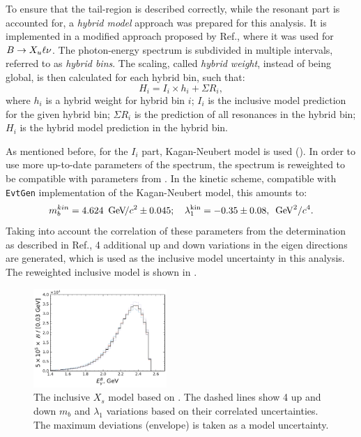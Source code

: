 To ensure that the tail-region is described correctly, while the resonant part is accounted for, a \textit{hybrid model} approach was prepared for this analysis.
It is implemented in a modified approach proposed by Ref.\cite{Ramirez:1989yk}, where it was used for $B\rightarrow X_u\ell\nu$.
The \BtoXsgamma photon-energy spectrum is subdivided in multiple intervals, referred to as \textit{hybrid bins}.
The scaling, called \textit{hybrid weight}, instead of being global, is then calculated for each hybrid bin, such that:
\begin{equation}\label{eq:hybrid_model_definition}
    H_i = I_i\times h_i + \Sigma R_i,
\end{equation}
where $h_i$ is a hybrid weight for hybrid bin $i$; 
$I_i$ is the inclusive model prediction for the given hybrid bin; 
$\Sigma R_i$ is the prediction of all resonances in the hybrid bin;
$H_i$ is the hybrid model prediction in the hybrid bin.

As mentioned before, for the $I_i$ part, Kagan-Neubert model is used ().
In order to use more up-to-date parameters of the spectrum, the spectrum is reweighted to be compatible with parameters from .
In the kinetic scheme, compatible with \texttt{EvtGen} implementation of the Kagan-Neubert model, this amounts to:
\begin{equation}\label{eq:simba_result_kinetic}
    m_b^{kin} =4.624~{\mathrm{\,Ge\kern -0.1em V\!/}c^2} \pm 0.045;  \quad \lambda^{\mathrm{kin}}_1 = -0.35\pm0.08,~\mathrm{\,Ge\kern -0.1em V}^2/c^4.
\end{equation}
Taking into account the correlation of these parameters from the determination as described in Ref.\cite{Bernlochner:2020jlt}, 4 additional up and down variations in the eigen directions are generated, which is used as the inclusive model uncertainty in this analysis.
The reweighted inclusive model is shown in .
\begin{figure}[htbp!]
    \centering
    \includegraphics[width=0.45\textwidth]{figures/data_samples/xs_model_inclusive.pdf}
    \caption{\label{fig:inclusive_reweighted}The inclusive $X_s$ model based on .
    The dashed lines show 4 up and down $m_b$ and $\lambda_1$ variations based on their correlated uncertainties.
    The maximum deviations (envelope) is taken as a model uncertainty.}
\end{figure}

